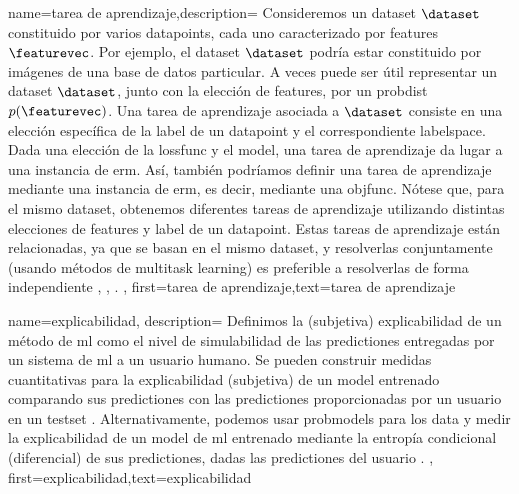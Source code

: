 {name={tarea de aprendizaje},description=
	{Consideremos un \gls{dataset} $\dataset$ constituido por varios \gls{datapoint}s, cada uno 
	caracterizado por \gls{feature}s $\featurevec$. Por ejemplo, el \gls{dataset} $\dataset$ 
	podría estar constituido por imágenes de una base de datos particular. A veces puede ser útil 
	 representar un \gls{dataset} $\dataset$, junto con la elección de \gls{feature}s, por un \gls{probdist} $p(\featurevec)$. 
	 Una tarea de aprendizaje asociada a $\dataset$ consiste en una elección específica de la 
	 \gls{label} de un \gls{datapoint} y el correspondiente \gls{labelspace}. 
	 Dada una elección de la \gls{lossfunc} y el \gls{model}, una tarea de aprendizaje da lugar 
	 a una instancia de \gls{erm}. Así, también podríamos definir una tarea de aprendizaje mediante una instancia de \gls{erm}, es decir, 
	 mediante una \gls{objfunc}. Nótese que, para el mismo \gls{dataset}, obtenemos diferentes tareas de aprendizaje utilizando 
	 distintas elecciones de \gls{feature}s y \gls{label} de un \gls{datapoint}. Estas tareas de aprendizaje  
	 están relacionadas, ya que se basan en el mismo \gls{dataset}, y resolverlas conjuntamente 
	 (usando métodos de \gls{multitask learning}) es preferible a resolverlas de forma independiente \cite{Caruana:1997wk}, \cite{JungGaphLassoSPL}, \cite{CSGraphSelJournal}.
	 },
	first={tarea de aprendizaje},text={tarea de aprendizaje
}

{name={explicabilidad},
	description={
		Definimos la (subjetiva) explicabilidad de un método de \gls{ml}
		como el nivel de simulabilidad \cite{Colin:2022aa} de las \gls{prediction}es
		entregadas por un sistema de \gls{ml} a un usuario humano.
		Se pueden construir medidas cuantitativas para la explicabilidad (subjetiva) de un \gls{model} entrenado
		comparando sus \gls{prediction}es con las \gls{prediction}es proporcionadas por un usuario
		en un \gls{testset} \cite{Zhang:2024aa,Colin:2022aa}.
		Alternativamente, podemos usar \gls{probmodel}s para los \gls{data}
		y medir la explicabilidad de un \gls{model} de \gls{ml} entrenado mediante la entropía condicional
		(diferencial) de sus \gls{prediction}es, dadas las \gls{prediction}es del usuario \cite{JunXML2020,Chen2018}.
	},
	first={explicabilidad},text={explicabilidad}
}
	
}

